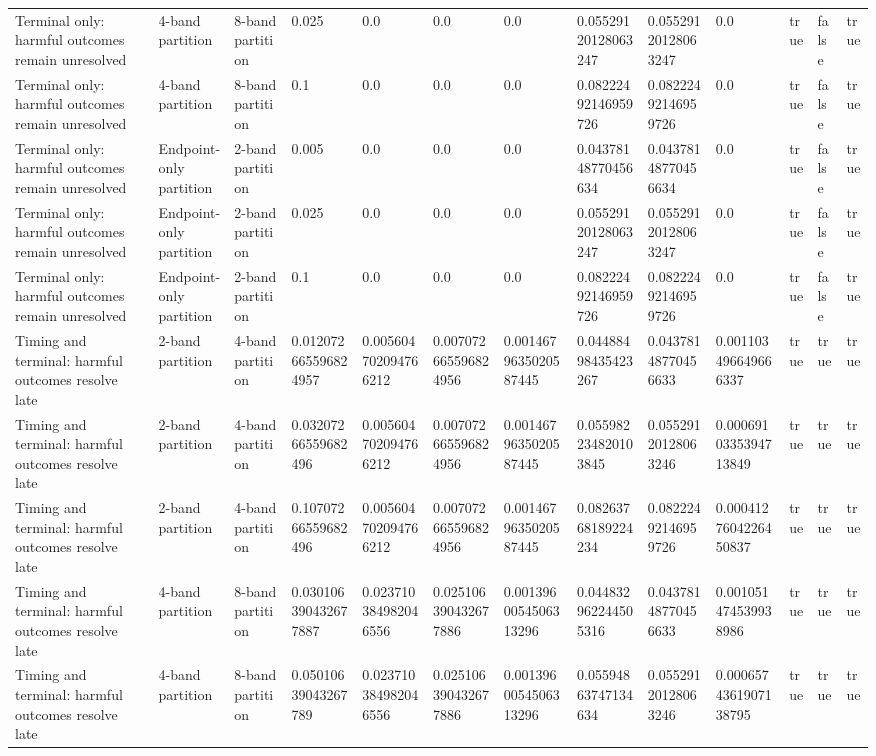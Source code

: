\begin{tabular}{lllllllllllll}
Terminal only: harmful outcomes remain unresolved & 4-band partition & 8-band partition & 0.025 & 0.0 & 0.0 & 0.0 & 0.05529120128063247 & 0.05529120128063247 & 0.0 & true & false & true \\
Terminal only: harmful outcomes remain unresolved & 4-band partition & 8-band partition & 0.1 & 0.0 & 0.0 & 0.0 & 0.08222492146959726 & 0.08222492146959726 & 0.0 & true & false & true \\
Terminal only: harmful outcomes remain unresolved & Endpoint-only partition & 2-band partition & 0.005 & 0.0 & 0.0 & 0.0 & 0.04378148770456634 & 0.04378148770456634 & 0.0 & true & false & true \\
Terminal only: harmful outcomes remain unresolved & Endpoint-only partition & 2-band partition & 0.025 & 0.0 & 0.0 & 0.0 & 0.05529120128063247 & 0.05529120128063247 & 0.0 & true & false & true \\
Terminal only: harmful outcomes remain unresolved & Endpoint-only partition & 2-band partition & 0.1 & 0.0 & 0.0 & 0.0 & 0.08222492146959726 & 0.08222492146959726 & 0.0 & true & false & true \\
Timing and terminal: harmful outcomes resolve late & 2-band partition & 4-band partition & 0.012072665596824957 & 0.005604702094766212 & 0.007072665596824956 & 0.0014679635020587445 & 0.04488498435423267 & 0.04378148770456633 & 0.001103496649666337 & true & true & true \\
Timing and terminal: harmful outcomes resolve late & 2-band partition & 4-band partition & 0.03207266559682496 & 0.005604702094766212 & 0.007072665596824956 & 0.0014679635020587445 & 0.055982234820103845 & 0.05529120128063246 & 0.0006910335394713849 & true & true & true \\
Timing and terminal: harmful outcomes resolve late & 2-band partition & 4-band partition & 0.10707266559682496 & 0.005604702094766212 & 0.007072665596824956 & 0.0014679635020587445 & 0.08263768189224234 & 0.08222492146959726 & 0.0004127604226450837 & true & true & true \\
Timing and terminal: harmful outcomes resolve late & 4-band partition & 8-band partition & 0.030106390432677887 & 0.023710384982046556 & 0.025106390432677886 & 0.0013960054506313296 & 0.044832962244505316 & 0.04378148770456633 & 0.001051474539938986 & true & true & true \\
Timing and terminal: harmful outcomes resolve late & 4-band partition & 8-band partition & 0.05010639043267789 & 0.023710384982046556 & 0.025106390432677886 & 0.0013960054506313296 & 0.05594863747134634 & 0.05529120128063246 & 0.0006574361907138795 & true & true & true \\

\end{tabular}
